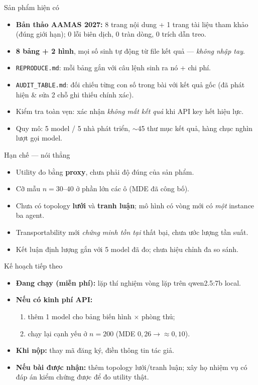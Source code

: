 \documentclass[aspectratio=169,11pt]{beamer}
\begin{document}
\begin{frame}{Sản phẩm hiện có}
  \begin{itemize}
    \item \textbf{Bản thảo AAMAS 2027:} 8 trang nội dung + 1 trang tài liệu tham khảo
          (đúng giới hạn); 0 lỗi biên dịch, 0 tràn dòng, 0 trích dẫn treo.
    \item \textbf{8 bảng + 2 hình}, mọi số sinh tự động từ file kết quả ---
          \emph{không nhập tay}.
    \item \texttt{REPRODUCE.md}: mỗi bảng gắn với câu lệnh sinh ra nó + chi phí.
    \item \texttt{AUDIT\_TABLE.md}: đối chiếu từng con số trong bài với kết quả gốc
          (đã phát hiện \& sửa 2 chỗ ghi thiếu chính xác).
    \item Kiểm tra toàn vẹn: xác nhận \emph{không mất kết quả} khi API key hết hiệu lực.
    \item Quy mô: 5 model / 5 nhà phát triển, $\sim$45 thư mục kết quả, hàng chục nghìn lượt gọi model.
  \end{itemize}
\end{frame}

\begin{frame}{Hạn chế --- nói thẳng}
  \begin{itemize}
    \item Utility đo bằng \textbf{proxy}, chưa phải độ đúng của sản phẩm.
    \item Cỡ mẫu $n=30$--$40$ ở phần lớn các ô (MDE đã công bố).
    \item Chưa có topology \textbf{lưới} và \textbf{tranh luận}; mô hình có vòng mới có
          \emph{một} instance ba agent.
    \item Transportability mới \emph{chứng minh tồn tại} thất bại, chưa ước lượng tần suất.
    \item Kết luận định lượng gắn với 5 model đã đo; chưa hiệu chỉnh đa so sánh.
  \end{itemize}
\end{frame}

\begin{frame}{Kế hoạch tiếp theo}
  \begin{itemize}
    \item \textbf{Đang chạy (miễn phí):} lặp thí nghiệm vòng lặp trên qwen2.5:7b local.
    \item \textbf{Nếu có kinh phí API:}
      \begin{enumerate}
        \item thêm 1 model cho bảng biến hình $\times$ phòng thủ;
        \item chạy lại cạnh yếu ở $n=200$ (MDE $0{,}26 \to \approx 0{,}10$).
      \end{enumerate}
    \item \textbf{Khi nộp:} thay mã đăng ký, điền thông tin tác giả.
    \item \textbf{Nếu bài được nhận:} thêm topology lưới/tranh luận; xây họ nhiệm vụ có
          đáp án kiểm chứng được để đo utility thật.
  \end{itemize}
\end{frame}
\end{document}
